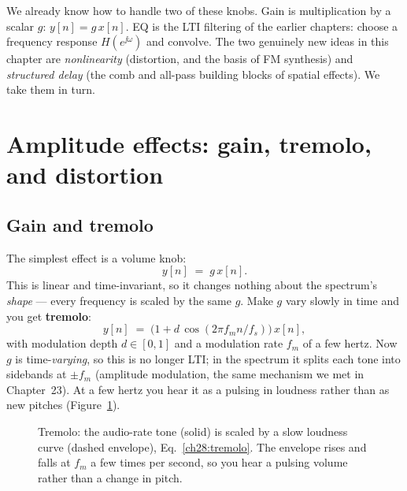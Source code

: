 We already know how to handle two of these knobs. Gain is multiplication by a scalar
$g$: $y[n]=g\,x[n]$. EQ is the LTI filtering of the earlier chapters: choose a
frequency response $H(e^{\jj\omega})$ and convolve. The two genuinely new ideas
in this chapter are \emph{nonlinearity} (distortion, and the basis of FM
synthesis) and \emph{structured delay} (the comb and all-pass building blocks of
spatial effects). We take them in turn.

\section{Amplitude effects: gain, tremolo, and distortion}
\label{ch28:amplitude}

\subsection{Gain and tremolo}

The simplest effect is a volume knob:
\begin{equation}
\label{ch28:gain}
y[n] \;=\; g\,x[n].
\end{equation}
This is linear and time-invariant, so it changes nothing about the spectrum's
\emph{shape} --- every frequency is scaled by the same $g$. Make $g$ vary slowly
in time and you get \textbf{tremolo}:
\begin{equation}
\label{ch28:tremolo}
y[n] \;=\; \bigl(1 + d\,\cos(2\pi f_m n / f_s)\bigr)\,x[n],
\end{equation}
with modulation depth $d\in[0,1]$ and a modulation rate $f_m$ of a few hertz.
Now $g$ is time-\emph{varying}, so this is no longer LTI; in the spectrum it
splits each tone into sidebands at $\pm f_m$ (amplitude modulation, the same
mechanism we met in Chapter~23). At a few hertz you hear it as a
pulsing in loudness rather than as new pitches
(Figure~\ref{ch28:fig-tremolo}).

\begin{figure}[H]
\centering
{}
\caption{Tremolo: the audio-rate tone (solid) is scaled by a slow loudness curve
(dashed envelope), Eq.~\eqref{ch28:tremolo}. The envelope rises and falls at
$f_m$ a few times per second, so you hear a pulsing volume rather than a change
in pitch.}
\label{ch28:fig-tremolo}
\end{figure}

